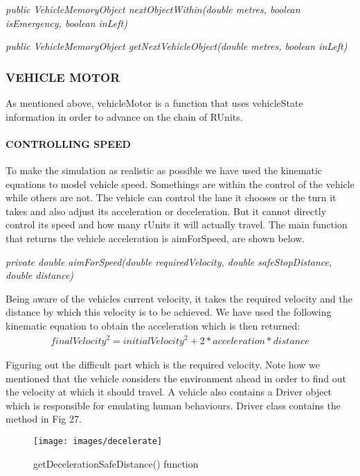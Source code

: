 \documentclass[11pt,a4paper]{article}
\begin{document}
		 \setlength{\parindent}{0cm}\bigskip
		 \textit{public VehicleMemoryObject nextObjectWithin(double metres, boolean isEmergency, boolean inLeft)}
		 
		 \textit{public VehicleMemoryObject getNextVehicleObject(double metres, boolean inLeft)}
  
  \subsubsection{VEHICLE MOTOR}
  
	As mentioned above, vehicleMotor is a function that uses vehicleState information in order to advance on the chain of RUnits. 
  
 
  	\paragraph{CONTROLLING SPEED}
  		To make the simulation as realistic as possible we have used the kinematic equations to model vehicle speed. Somethings are within the control of the vehicle while others are not. The vehicle can control the lane it chooses or the turn it takes and also adjust its acceleration or deceleration. But it cannot directly control its speed and how many rUnits it will actually travel. The main function that returns the vehicle acceleration is aimForSpeed, are shown below.
  			
  			\setlength{\parindent}{0cm}\bigskip
  			\textit{private double aimForSpeed(double requiredVelocity, double safeStopDistance, double distance)}
  			
   			Being aware of the vehicle\textquotesingle s current velocity, it takes the required velocity and the distance by which this velocity is to be achieved. We have used the following kinematic equation to obtain the acceleration which is then returned:
   				\begin{align}
   				{finalVelocity}^2={initialVelocity}^2 +2*acceleration*distance \nonumber
   			 	\end{align}
  
 	
  	Figuring out the difficult part which is the required velocity. Note how we mentioned that the vehicle considers the environment ahead in order to find out the velocity at which it should travel. A vehicle also contains a Driver object which is responsible for emulating human behaviours. Driver class contains the method in Fig 27.
  	\begin{figure}[h!]
			\texttt{[image: images/decelerate]}
			\caption{getDecelerationSafeDistance() function}
			\centering
		\end{figure} 
		
\end{document}
